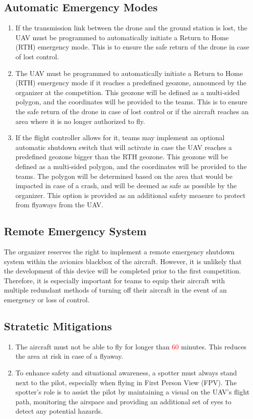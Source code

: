 \documentclass{article}
\begin{document}
\subsection{Automatic Emergency Modes}
\begin{enumerate}
  \item If the transmission link between the drone and the ground station is lost, the UAV must be programmed to automatically initiate a Return to Home (RTH) emergency mode. This is to ensure the safe return of the drone in case of lost control.
  \item The UAV must be programmed to automatically initiate a Return to Home (RTH) emergency mode if it reaches a predefined geozone, announced by the organizer at the competition. This geozone will be defined as a multi-sided polygon, and the coordinates will be provided to the teams. This is to ensure the safe return of the drone in case of lost control or if the aircraft reaches an area where it is no longer authorized to fly.
  \item If the flight controller allows for it, teams may implement an optional automatic shutdown switch that will activate in case the UAV reaches a predefined geozone bigger than the RTH geozone. This geozone will be defined as a multi-sided polygon, and the coordinates will be provided to the teams. The polygon will be determined based on the area that would be impacted in case of a crash, and will be deemed as safe as possible by the organizer. This option is provided as an additional safety measure to protect from flyaways from the UAV.
\end{enumerate}


\subsection{Remote Emergency System}
The organizer reserves the right to implement a remote emergency shutdown system within the avionics blackbox of the aircraft. However, it is unlikely that the development of this device will be completed prior to the first competition. Therefore, it is especially important for teams to equip their aircraft with multiple redundant methods of turning off their aircraft in the event of an emergency or loss of control.

\subsection{Stratetic Mitigations}
\begin{enumerate}
  \item The aircraft must not be able to fly for longer than \textcolor{red}{60} minutes. This reduces the area at risk in case of a flyaway.
  \item To enhance safety and situational awareness, a spotter must always stand next to the pilot, especially when flying in First Person View (FPV). The spotter's role is to assist the pilot by maintaining a visual on the UAV's flight path, monitoring the airspace and providing an additional set of eyes to detect any potential hazards. 
\end{enumerate}
\end{document}
